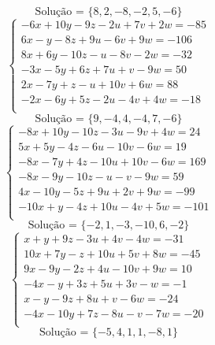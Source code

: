 \documentclass[12pt,oneside,a4paper]{article}
\begin{document}
\begin{equation*}
\text{Solução = }\{8,2,-8,-2,5,-6\}
\end{equation*}
\vspace{\baselineskip}
\begin{equation*}
\begin{cases}
-6x+10y-9z-2u+7v+2w=-85 \\
6x-y-8z+9u-6v+9w=-106 \\
8x+6y-10z-u-8v-2w=-32 \\
-3x-5y+6z+7u+v-9w=50 \\
2x-7y+z-u+10v+6w=88 \\
-2x-6y+5z-2u-4v+4w=-18 \\
\end{cases}
\end{equation*}
\begin{equation*}
\text{Solução = }\{9,-4,4,-4,7,-6\}
\end{equation*}
\vspace{\baselineskip}
\begin{equation*}
\begin{cases}
-8x+10y-10z-3u-9v+4w=24 \\
5x+5y-4z-6u-10v-6w=19 \\
-8x-7y+4z-10u+10v-6w=169 \\
-8x-9y-10z-u-v-9w=59 \\
4x-10y-5z+9u+2v+9w=-99 \\
-10x+y-4z+10u-4v+5w=-101 \\
\end{cases}
\end{equation*}
\begin{equation*}
\text{Solução = }\{-2,1,-3,-10,6,-2\}
\end{equation*}
\vspace{\baselineskip}
\begin{equation*}
\begin{cases}
x+y+9z-3u+4v-4w=-31 \\
10x+7y-z+10u+5v+8w=-45 \\
9x-9y-2z+4u-10v+9w=10 \\
-4x-y+3z+5u+3v-w=-1 \\
x-y-9z+8u+v-6w=-24 \\
-4x-10y+7z-8u-v-7w=-20 \\
\end{cases}
\end{equation*}
\begin{equation*}
\text{Solução = }\{-5,4,1,1,-8,1\}
\end{equation*}
\end{document}
